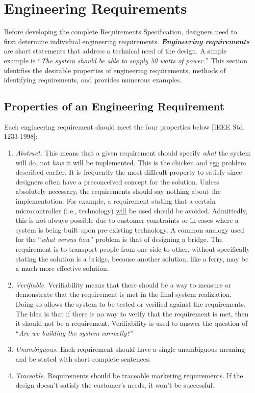 \section{Engineering Requirements}
\label{section:engineering-requirements}

Before developing the complete Requirements Specification, designers
need to first determine individual engineering requirements.
\emph{\textbf{Engineering requirements}} are short statements that
address a technical need of the design. A simple example is ``\emph{The
system should be able to supply 50 watts of power.}'' This section
identifies the desirable properties of engineering requirements, methods
of identifying requirements, and provides numerous examples.

\subsection{Properties of an Engineering Requirement}
\label{section:properties-of-an-engineering-requirement}

Each engineering requirement should meet the four properties below
{[}IEEE Std. 1233-1998{]}:

\begin{enumerate}
\def\labelenumi{\arabic{enumi})}
\item
  \emph{Abstract.} This means that a given requirement should specify
  \emph{what} the system will do, not \emph{how} it will be implemented.
  This is the chicken and egg problem described earlier. It is
  frequently the most difficult property to satisfy since designers
  often have a preconceived concept for the solution. Unless absolutely
  necessary, the requirements should say nothing about the
  implementation. For example, a requirement stating that a certain
  microcontroller (i.e., technology) \ul{will} be used should be
  avoided. Admittedly, this is not always possible due to customer
  constraints or in cases where a system is being built upon
  pre-existing technology. A common analogy used for the ``\emph{what
  versus how}'' problem is that of designing a bridge. The requirement
  is to transport people from one side to other, without specifically
  stating the solution is a bridge, because another solution, like a
  ferry, may be a much more effective solution.
\item
  \emph{Verifiable.} Verifiability means that there should be a way to
  measure or demonstrate that the requirement is met in the final system
  realization. Doing so allows the system to be tested or verified
  against the requirements. The idea is that if there is no way to
  verify that the requirement is met, then it should not be a
  requirement. Verifiability is used to answer the question of
  ``\emph{Are we building the system correctly?}''
\item
  \emph{Unambiguous.} Each requirement should have a single unambiguous
  meaning and be stated with short complete sentences.
\item
  \emph{Traceable.} Requirements should be traceable marketing
  requirements. If the design doesn't satisfy the customer's needs, it
  won't be successful.
\end{enumerate}

